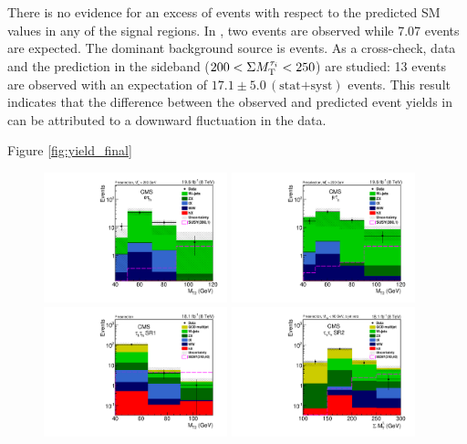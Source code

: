 There is no evidence for an excess of events with respect to the predicted SM values in any of the signal regions. In \bintwo, two events are observed while 7.07 events are expected. The dominant background source is \wjets events. As a cross-check, data and the prediction in the sideband ($200 < \Sigma M_\mathrm{T}^{\tau_i} < 250$\GeV) are studied: 13 events are observed with an expectation of $17.1 \pm 5.0\,(\text{stat+syst})$ events.
This result indicates that the difference between the observed and predicted event yields in \bintwo can be attributed to a downward fluctuation in the data.

Figure \ref{fig:yield_final}
\begin{figure}[!htb]
\centering
\includegraphics[width=0.475\textwidth,keepaspectratio=true]{Figure_004-a.pdf}
\includegraphics[width=0.475\textwidth,keepaspectratio=true]{Figure_004-b.pdf}
\includegraphics[width=0.475\textwidth,keepaspectratio=true]{Figure_004-c.pdf}
\includegraphics[width=0.475\textwidth,keepaspectratio=true]{Figure_004-d.pdf}

\end{figure}
